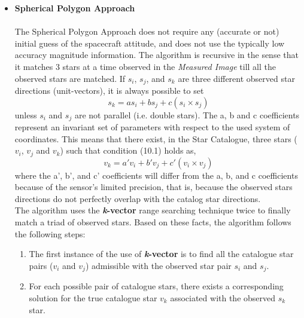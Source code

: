 \documentclass[../../main.tex]{subfiles}
\begin{document}
\begin{itemize}
    \item \textbf{Spherical Polygon Approach}\\
    \\
    The Spherical Polygon Approach does not require any (accurate or not) initial guess of the spacecraft attitude, and does not use the typically low accuracy magnitude information. The algorithm is recursive in the sense that it matches 3 stars at a time observed in the \textit{Measured Image} till all the observed stars are matched. 
   If \textit{$s_{i}$}, \textit{$s_{j}$}, and \textit{$s_{k}$} are three different observed star directions (unit-vectors), it is always possible to set
   \begin{equation}
        \textit{$s_{k}$} = a\textit{$s_{i}$} + b\textit{$s_{j}$} +c(\textit{$s_{i}$} \times \textit{$s_{j}$})
    \end{equation}
    unless \textit{$s_{i}$} and \textit{$s_{j}$} are not parallel (i.e. double stars). The a, b and c coefficients represent an invariant set of parameters with respect to the used system of coordinates. This means that there exist, in the Star Catalogue, three stars (\textit{$v_{i}$}, \textit{$v_{j}$} and \textit{$v_{k}$}) such that condition (10.1) holds as,  
    \begin{equation}                    
        \textit{$v_{k}$} = a'\textit{$v_{i}$} + b'\textit{$v_{j}$} +c'(\textit{$v_{i}$} \times \textit{$v_{j}$})
    \end{equation}
    where the a', b', and c' coefficients will differ from the a, b, and c coefficients because of the sensor’s limited precision, that is, because the observed stars directions do not perfectly overlap with the catalog star directions.\\
    The algorithm uses the \textbf{\textit{k}-vector} range searching technique twice to finally match a triad of observed stars. Based on these facts, the algorithm follows the following steps:
    \begin{enumerate}                   
        \item The first instance of the use of \textbf{\textit{k}-vector} is to find all the catalogue star pairs (\textit{$v_{i}$} and \textit{$v_{j}$}) admissible with the observed star pair \textit{$s_{i}$} and \textit{$s_{j}$}.
        \item For each possible pair of catalogue stars, there exists a corresponding solution for the true catalogue star \textit{$v_{k}$} associated with the observed \textit{$s_{k}$} star.

\end{enumerate}
\end{itemize}
\end{document}
